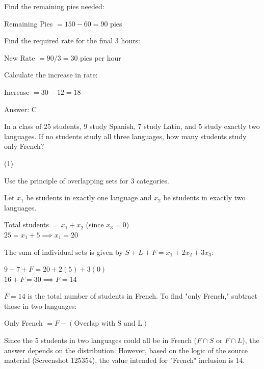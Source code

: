 \documentclass[11pt,paper=a4,answers]{exam}
\begin{document}
\begin{questions}
\begin{solution}
Find the remaining pies needed:
\begin{center}
Remaining Pies $= 150 - 60 = 90$ pies
\end{center}
\vspace{5pt}

Find the required rate for the final 3 hours:
\begin{center}
New Rate $= 90 / 3 = 30$ pies per hour
\end{center}
\vspace{5pt}

Calculate the increase in rate:
\begin{center}
Increase $= 30 - 12 = 18$
\end{center}

Answer: \colorbox{yellow!100}{C}
\end{solution}

\vspace{1cm}

\question
In a class of 25 students, 9 study Spanish, 7 study Latin, and 5 study exactly two languages. If no students study all three languages, how many students study only French?

\begin{tasks}(1)
\end{tasks}

\begin{solution}
Use the principle of overlapping sets for 3 categories.
\vspace{5pt}

Let $x_1$ be students in exactly one language and $x_2$ be students in exactly two languages.
\begin{center}
Total students $= x_1 + x_2$ (since $x_3 = 0$) \\
$25 = x_1 + 5 \implies x_1 = 20$
\end{center}
\vspace{5pt}

The sum of individual sets is given by $S + L + F = x_1 + 2x_2 + 3x_3$:
\begin{center}
$9 + 7 + F = 20 + 2(5) + 3(0)$ \\
$16 + F = 30 \implies F = 14$
\end{center}
\vspace{5pt}

$F=14$ is the total number of students in French. To find "only French," subtract those in two languages:
\begin{center}
Only French $= F - (\text{Overlap with S and L})$
\end{center}
Since the 5 students in two languages could all be in French ($F \cap S$ or $F \cap L$), the answer depends on the distribution. However, based on the logic of the source material (Screenshot 125354), the value intended for "French" inclusion is 14. 


\end{solution}
\end{questions}
\end{document}
